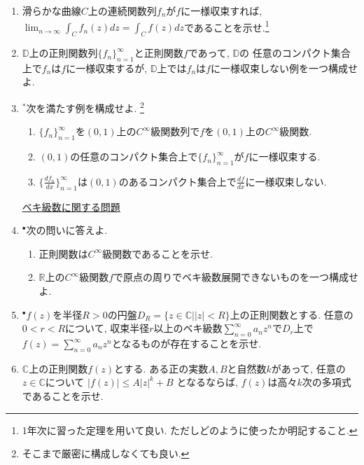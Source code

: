 \documentclass[dvipdfmx,a4paper,11pt]{article}
\newcommand{\R}{\mathbb{R}}
\newcommand{\C}{\mathbb{C}}
\newcommand{\D}{\mathbb{D}}
\theoremstyle{definition}
\newcommand{\drv}[2]{\frac{d #1}{d#2}}
\begin{document}
\begin{enumerate}[label=\textbf{問}3.\arabic*]

\item 滑らかな曲線$C$上の連続関数列$f_n$が$f$に一様収束すれば,
$\lim_{n\rightarrow \infty} \int_{C}f_n(z) dz = \int_{C} f(z) dz$であることを示せ.\footnote{1年次に習った定理を用いて良い. ただしどのように使ったか明記すること.}
\item 
$\D$上の正則関数列$\{ f_{n}\}_{n=1}^{\infty}$と正則関数$f$であって, $\D$の
任意のコンパクト集合上で$f_n$は$f$に一様収束するが, $\D$上では$f_n$は$f$に一様収束しない例を一つ構成せよ. 


\item $^{*}$次を満たす例を構成せよ. \footnote{そこまで厳密に構成しなくても良い.}
 \begin{enumerate}
\setlength{\parskip}{0cm} 
  \setlength{\itemsep}{0cm} 
\item $\{ f_{n}\}_{n=1}^{\infty}$を$(0,1)$上の$C^{\infty}$級関数列で$f$を$(0,1)$上の$C^{\infty}$級関数.
\item $(0,1)$の任意のコンパクト集合上で$\{ f_{n}\}_{n=1}^{\infty}$が$f$に一様収束する.
\item $\{ \drv{f_{n}}{x}\}_{n=1}^{\infty}$は$(0,1)$のあるコンパクト集合上で$\drv{f}{x}$に一様収束しない.
\end{enumerate}

 \vspace{12pt}
\hspace{-36pt}\underline{ベキ級数に関する問題}

\item $^{\bullet}$次の問いに答えよ.
 \begin{enumerate}
\setlength{\parskip}{0cm} 
  \setlength{\itemsep}{0cm} 
\item 正則関数は$C^{\infty}$級関数であることを示せ.
\item $\R$上の$C^{\infty}$級関数$f$で原点の周りでベキ級数展開できないものを一つ構成せよ. 
\end{enumerate}

\item $^{\bullet}$$f(z) $を半径$R>0$の円盤$D_{R} = \{ z \in \C | |z|<R\}$上の正則関数とする. 任意の$0 < r < R$について, 収束半径$r$以上のベキ級数$\sum_{n=0}^{\infty} a_n z^n$で$D_{r}$上で$f(z) = \sum_{n=0}^{\infty} a_n z^n$となるものが存在することを示せ. 

  \item $\C$上の正則関数$f(z)$とする. ある正の実数$A,B$と自然数$k$があって, 任意の$z \in \C$について
  $
  |f(z)| \le A|z|^k +B
  $
  となるならば, $f(z)$は高々$k$次の多項式であることを示せ.
  



\end{enumerate}
\end{document}
